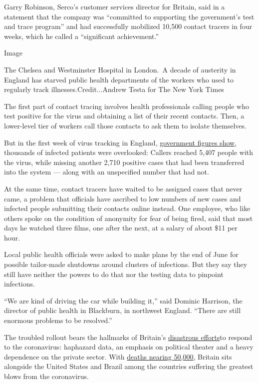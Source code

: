 Garry Robinson, Serco's customer services director for Britain, said in
a statement that the company was ``committed to supporting the
government's test and trace program'' and had successfully mobilized
10,500 contact tracers in four weeks, which he called a ``significant
achievement.''

Image

The Chelsea and Westminster Hospital in London.~A decade of austerity in
England has starved public health departments of the workers who used to
regularly track illnesses.Credit...Andrew Testa for The New York Times

The first part of contact tracing involves health professionals calling
people who test positive for the virus and obtaining a list of their
recent contacts. Then, a lower-level tier of workers call those contacts
to ask them to isolate themselves.

But in the first week of virus tracking in England,
\href{https://assets.publishing.service.gov.uk/government/uploads/system/uploads/attachment_data/file/891703/NHS_test_and_trace_bulletin__England__-_28_May_to_3_June_2020.pdf}{government
figures show}, thousands of infected patients were overlooked: Callers
reached 5,407 people with the virus, while missing another 2,710
positive cases that had been transferred into the system --- along with
an unspecified number that had not.

At the same time, contact tracers have waited to be assigned cases that
never came, a problem that officials have ascribed to low numbers of new
cases and infected people submitting their contacts online instead. One
employee, who like others spoke on the condition of anonymity for fear
of being fired, said that most days he watched three films, one after
the next, at a salary of about \$11 per hour.

Local public health officials were asked to make plans by the end of
June for possible tailor-made shutdowns around clusters of infections.
But they say they still have neither the powers to do that nor the
testing data to pinpoint infections.

``We are kind of driving the car while building it,'' said Dominic
Harrison, the director of public health in Blackburn, in northwest
England. ``There are still enormous problems to be resolved.''

The troubled rollout bears the hallmarks of Britain's
\href{https://www.nytimes.com/2020/04/16/world/europe/coronavirus-antibody-test-uk.html}{disastrous
efforts}to respond to the coronavirus: haphazard data, an emphasis on
political theater and a heavy dependence on the private sector. With
\href{https://www.reuters.com/article/us-health-coronavirus-britain-casualties/uk-covid-19-death-toll-tops-47000-as-pressure-heaps-on-pm-johnson-idUSKBN23211E}{deaths
nearing 50,000}, Britain sits alongside the United States and Brazil
among the countries suffering the greatest blows from the coronavirus.

